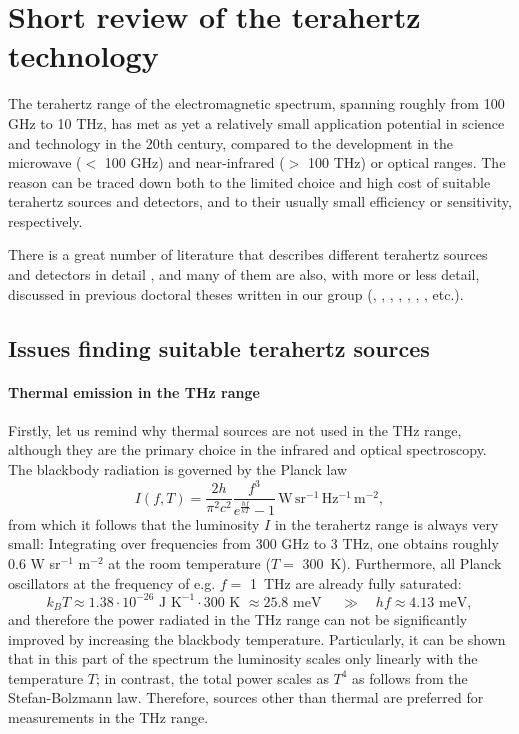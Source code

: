 \section{Short review of the terahertz technology}
The terahertz range of the electromagnetic spectrum, spanning roughly from 100 GHz to 10 THz, has met as yet a relatively small application potential in science and technology in the 20th century, compared to the development in the microwave ($<$ 100 GHz) and near-infrared ($>$ 100 THz) or optical ranges. The reason can be traced down both to the limited choice and high cost of suitable terahertz sources and detectors, and to their usually small efficiency or sensitivity, respectively. 


There is a great number of literature that describes different terahertz sources and detectors in detail \cite[pp. 155-158]{lee2008book}, %
and many of them are also, with more or less detail, discussed in previous doctoral theses written in our group (\cite[pp. 2-30]{pashkin2004phd}, \cite[pp. 19-25]{nemec2006phd}, \cite[pp. 7-26]{fekete2008phd}, \cite[pp. 11-21]{sibik2010dp}, \cite[pp. 31-45]{yahiaoui2011phd}, \cite[pp. 33-38]{mics2012phd}, \cite[pp. 25-33]{skoromets2013phd}, etc.).

\subsection{Issues finding suitable terahertz sources}
\paragraph{Thermal emission in the THz range}
Firstly, let us remind why thermal sources are not used in the THz range, although they are the primary choice in the infrared and optical spectroscopy. The blackbody radiation is governed by the Planck law %
\begin{equation}I(f, T) = \frac{2 h}{\pi^2 c^2}\frac{f^3}{e^{\frac{h f}{kT}}-1} \mathrm{\,W\,sr^{-1}\,Hz^{-1}\,m^{-2}}, \label{eq_planck}\end{equation}
from which it follows that the luminosity $I$ in the terahertz range is always very small: Integrating over frequencies from 300 GHz to 3 THz, one obtains roughly 0.6 W sr$^{-1}$ m$^{-2}$ at the room temperature ($T=$ 300~K).  Furthermore, all Planck oscillators at the frequency of e.g. $f =$ 1~THz are already fully saturated:
$$k_B T \approx 1.38\cdot 10^{-26} \text{ J K}^{-1} \cdot 300 \text{ K~} \approx 25.8 \text{ meV } \quad\gg\quad h f \approx 4.13 \text{ meV}, $$
and therefore the power radiated in the THz range can not be significantly improved by increasing the blackbody temperature. Particularly, it can be shown that in this part of the spectrum the luminosity scales only linearly with the temperature $T$; in contrast, the total power scales as $T^{4}$ as follows from the Stefan-Bolzmann law. Therefore, sources other than thermal are preferred for measurements in the THz range.

